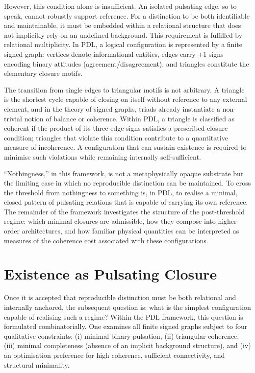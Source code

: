 \documentclass{article}
\theoremstyle{definition}
\newcommand{\PDL}{\ensuremath{\mathrm{PDL}}}
\begin{document}
However, this condition alone is insufficient.
An isolated pulsating edge, so to speak, cannot robustly support reference.
For a distinction to be both identifiable and maintainable, it must be embedded within a relational structure that does not implicitly rely on an undefined background.
This requirement is fulfilled by relational multiplicity.
In \PDL{}, a logical configuration is represented by a finite signed graph: vertices denote informational entities, edges carry \(\pm 1\) signs encoding binary attitudes (agreement/disagreement), and triangles constitute the elementary closure motifs.%
\cite{PDL_Main_2026,PDL_Minimal_Closures_2026}

The transition from single edges to triangular motifs is not arbitrary.
A triangle is the shortest cycle capable of closing on itself without reference to any external element, and in the theory of signed graphs, triads already instantiate a non-trivial notion of balance or coherence.%
\cite{PDL_Topological_2026}
Within \PDL{}, a triangle is classified as coherent if the product of its three edge signs satisfies a prescribed closure condition; triangles that violate this condition contribute to a quantitative measure of incoherence.
A configuration that can sustain existence is required to minimise such violations while remaining internally self-sufficient.

“Nothingness,” in this framework, is not a metaphysically opaque substrate but the limiting case in which no reproducible distinction can be maintained.
To cross the threshold from nothingness to something is, in \PDL{}, to realise a minimal, closed pattern of pulsating relations that is capable of carrying its own reference.%
\cite{PDL_Main_2026}
The remainder of the framework investigates the structure of the post-threshold regime: which minimal closures are admissible, how they compose into higher-order architectures, and how familiar physical quantities can be interpreted as measures of the coherence cost associated with these configurations.

\section{Existence as Pulsating Closure}
\label{sec:pulsating_closure}

Once it is accepted that reproducible distinction must be both relational and internally anchored, the subsequent question is: what is the simplest configuration capable of realising such a regime?
Within the \PDL{} framework, this question is formulated combinatorially.
One examines all finite signed graphs subject to four qualitative constraints: (i) minimal binary pulsation, (ii) triangular coherence, (iii) minimal completeness (absence of an implicit background structure), and (iv) an optimisation preference for high coherence, sufficient connectivity, and structural minimality.%
\cite{PDL_Main_2026,PDL_Minimal_Closures_2026}
\end{document}
